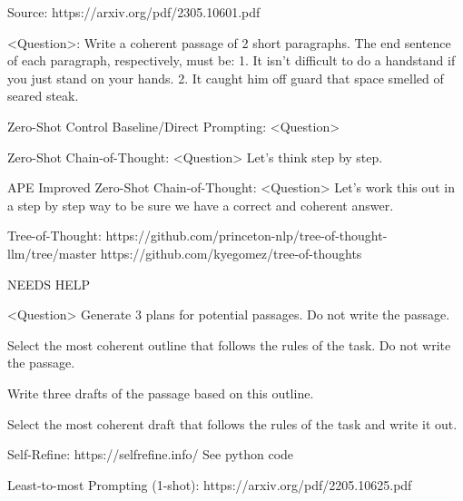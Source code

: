 \documentclass[11pt]{article}
\begin{document}
Source: https://arxiv.org/pdf/2305.10601.pdf

<Question>: 
Write a coherent passage of 2 short paragraphs. The end sentence of each paragraph, respectively, must be: 1. It isn't difficult to do a handstand if you just stand on your hands. 2. It caught him off guard that space smelled of seared steak.

Zero-Shot Control Baseline/Direct Prompting:
<Question>

Zero-Shot Chain-of-Thought:
<Question>
Let's think step by step.

APE Improved Zero-Shot Chain-of-Thought:
<Question>
Let's work this out in a step by step way to be sure we have a correct and coherent answer.

Tree-of-Thought: https://github.com/princeton-nlp/tree-of-thought-llm/tree/master https://github.com/kyegomez/tree-of-thoughts

NEEDS HELP

<Question>
Generate 3 plans for potential passages. Do not write the passage.

Select the most coherent outline that follows the rules of the task. Do not write the passage.

Write three drafts of the passage based on this outline.

Select the most coherent draft that follows the rules of the task and write it out.

Self-Refine: https://selfrefine.info/
See python code

Least-to-most Prompting (1-shot): https://arxiv.org/pdf/2205.10625.pdf
\end{document}
